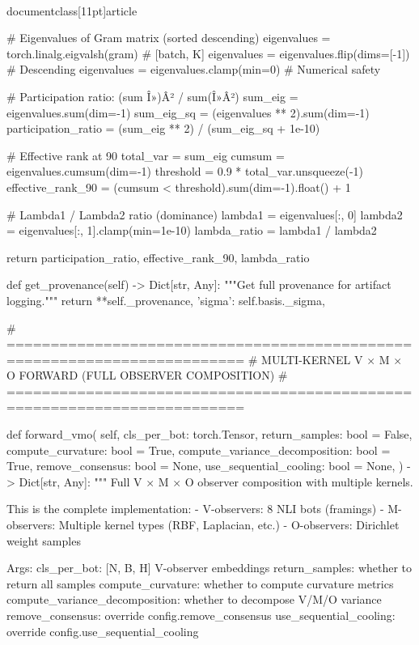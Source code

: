 \\documentclass[11pt]{article}
\begin{document}
\begin{CodeBlock}
{{{{        # Eigenvalues of Gram matrix (sorted descending)
        eigenvalues = torch.linalg.eigvalsh(gram)  # [batch, K]
        eigenvalues = eigenvalues.flip(dims=[-1])  # Descending
        eigenvalues = eigenvalues.clamp(min=0)  # Numerical safety
        
        # Participation ratio: (sum Î»)Â² / sum(Î»Â²)
        sum_eig = eigenvalues.sum(dim=-1)
        sum_eig_sq = (eigenvalues ** 2).sum(dim=-1)
        participation_ratio = (sum_eig ** 2) / (sum_eig_sq + 1e-10)
        
        # Effective rank at 90%
        total_var = sum_eig
        cumsum = eigenvalues.cumsum(dim=-1)
        threshold = 0.9 * total_var.unsqueeze(-1)
        effective_rank_90 = (cumsum < threshold).sum(dim=-1).float() + 1
        
        # Lambda1 / Lambda2 ratio (dominance)
        lambda1 = eigenvalues[:, 0]
        lambda2 = eigenvalues[:, 1].clamp(min=1e-10)
        lambda_ratio = lambda1 / lambda2
        
        return participation_ratio, effective_rank_90, lambda_ratio
    
    def get_provenance(self) -> Dict[str, Any]:
        """Get full provenance for artifact logging."""
        return {
            **self._provenance,
            'sigma': self.basis._sigma,
        }
    
    # =========================================================================
    # MULTI-KERNEL V × M × O FORWARD (FULL OBSERVER COMPOSITION)
    # =========================================================================
    
    def forward_vmo(
        self,
        cls_per_bot: torch.Tensor,
        return_samples: bool = False,
        compute_curvature: bool = True,
        compute_variance_decomposition: bool = True,
        remove_consensus: bool = None,
        use_sequential_cooling: bool = None,
    ) -> Dict[str, Any]:
        """
        Full V × M × O observer composition with multiple kernels.
        
        This is the complete implementation:
        - V-observers: 8 NLI bots (framings)
        - M-observers: Multiple kernel types (RBF, Laplacian, etc.)
        - O-observers: Dirichlet weight samples
        
        Args:
            cls_per_bot: [N, B, H] V-observer embeddings
            return_samples: whether to return all samples
            compute_curvature: whether to compute curvature metrics
            compute_variance_decomposition: whether to decompose V/M/O variance
            remove_consensus: override config.remove_consensus
            use_sequential_cooling: override config.use_sequential_cooling
            
}}}}
\end{CodeBlock}
\end{document}
